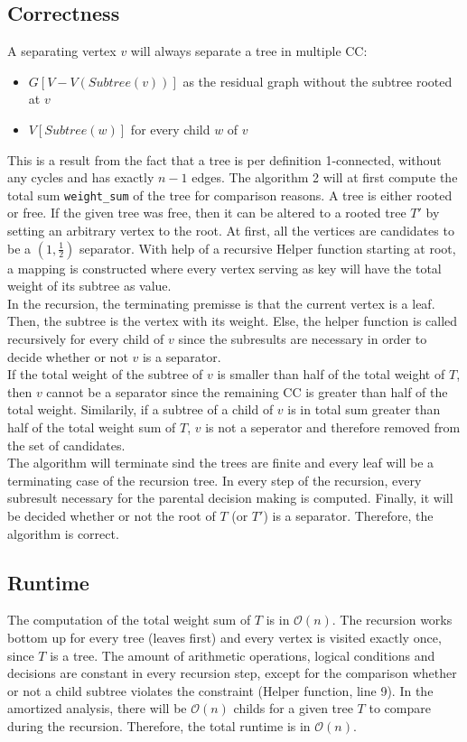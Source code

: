 \documentclass[a4paper,12pt,headsepline]{scrartcl}
\begin{document}
\subsection*{Correctness}
A separating vertex $v$ will always separate a tree in multiple CC:
\begin{itemize}
	\item $G[V - V(Subtree(v))]$ as the residual graph without the subtree rooted at $v$
	\item $V[Subtree(w)]$ for every child $w$ of $v$
\end{itemize}
This is a result from the fact that a tree is per definition 1-connected, without any cycles and has exactly $n-1$ edges. The algorithm 2 will at first compute the total sum \texttt{weight\_sum} of the tree for comparison reasons. A tree is either rooted or free. If the given tree was free, then it can be altered to a rooted tree $T'$ by setting an arbitrary vertex to the root. At first, all the vertices are candidates to be a $\left(1,\frac{1}{2}\right)$ separator. With help of a recursive Helper function starting at root, a mapping is constructed where every vertex serving as key will have the total weight of its subtree as value.\\
In the recursion, the terminating premisse is that the current vertex is a leaf. Then, the subtree is the vertex with its weight. Else, the helper function is called recursively for every child of $v$ since the subresults are necessary in order to decide whether or not $v$ is a separator.\\ 
If the total weight of the subtree of $v$ is smaller than half of the total weight of $T$, then $v$ cannot be a separator since the remaining CC is greater than half of the total weight. Similarily, if a subtree of a child of $v$ is in total sum greater than half of the total weight sum of $T$, $v$ is not a seperator and therefore removed from the set of candidates.\\
The algorithm will terminate sind the trees are finite and every leaf will be a terminating case of the recursion tree. In every step of the recursion, every subresult necessary for the parental decision making is computed. Finally, it will be decided whether or not the root of $T$ (or $T'$) is a separator. Therefore, the algorithm is correct.
\subsection*{Runtime}
The computation of the total weight sum of $T$ is in $\mathcal{O}(n)$. The recursion works bottom up for every tree (leaves first) and every vertex is visited exactly once, since $T$ is a tree. The amount of arithmetic operations, logical conditions and decisions are constant in every recursion step, except for the comparison whether or not a child subtree violates the constraint (Helper function, line 9). In the amortized analysis, there will be $\mathcal{O}(n)$ childs for a given tree $T$ to compare during the recursion. Therefore, the total runtime is in $\mathcal{O}(n)$.
\end{document}
